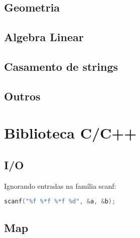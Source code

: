 \documentclass[a4paper,twocolumn, 10pt, landscape]{article}
\begin{document}
\subsection{Geometria}







\subsection{Algebra Linear}


\subsection{Casamento de strings}


\subsection{Outros}





\section{Biblioteca C/C++}
\subsection{I/O}
Ignorando entradas na família scanf:
\begin{lstlisting}[language=c, label=cio, caption={Ignora os dois floats do meio. Retornará 2 no sucesso.}]
 scanf("%f %*f %*f %d", &a, &b);
\end{lstlisting}


\subsection{Map}

\end{document}
